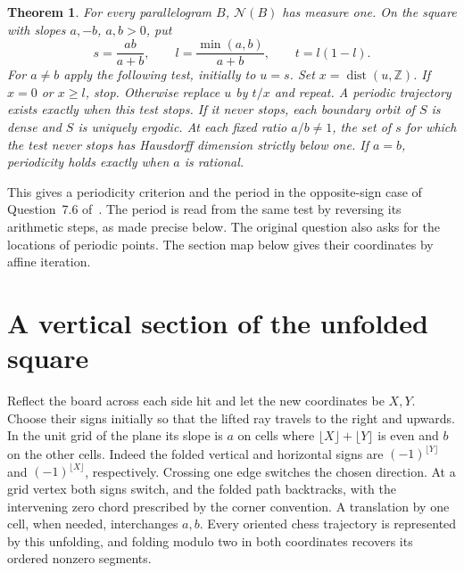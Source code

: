 \documentclass[11pt]{article}
\newtheorem{theorem}{Theorem}
\newcommand{\dist}{\operatorname{dist}}
\newcommand{\Z}{\mathbb Z}
\begin{document}
\begin{theorem}\label{main}
For every parallelogram $B$, $\mathcal N(B)$ has measure one. On the square with slopes $a,-b$, $a,b>0$, put
\[
 s=\frac{ab}{a+b},\qquad l=\frac{\min(a,b)}{a+b},\qquad t=l(1-l).
\]
For $a\ne b$ apply the following test, initially to $u=s$. Set $x=\dist(u,\Z)$. If $x=0$ or $x\ge l$, stop. Otherwise replace $u$ by $t/x$ and repeat. A periodic trajectory exists exactly when this test stops. If it never stops, each boundary orbit of $S$ is dense and $S$ is uniquely ergodic. At each fixed ratio $a/b\ne1$, the set of $s$ for which the test never stops has Hausdorff dimension strictly below one. If $a=b$, periodicity holds exactly when $a$ is rational.
\end{theorem}

This gives a periodicity criterion and the period in the opposite-sign case of Question~7.6 of~\cite{hm}. The period is read from the same test by reversing its arithmetic steps, as made precise below. The original question also asks for the locations of periodic points. The section map below gives their coordinates by affine iteration.

\section{A vertical section of the unfolded square}
Reflect the board across each side hit and let the new coordinates be $X,Y$. Choose their signs initially so that the lifted ray travels to the right and upwards. In the unit grid of the plane its slope is $a$ on cells where $\lfloor X\rfloor+\lfloor Y\rfloor$ is even and $b$ on the other cells. Indeed the folded vertical and horizontal signs are $(-1)^{\lfloor Y\rfloor}$ and $(-1)^{\lfloor X\rfloor}$, respectively. Crossing one edge switches the chosen direction. At a grid vertex both signs switch, and the folded path backtracks, with the intervening zero chord prescribed by the corner convention. A translation by one cell, when needed, interchanges $a,b$. Every oriented chess trajectory is represented by this unfolding, and folding modulo two in both coordinates recovers its ordered nonzero segments.
\end{document}
